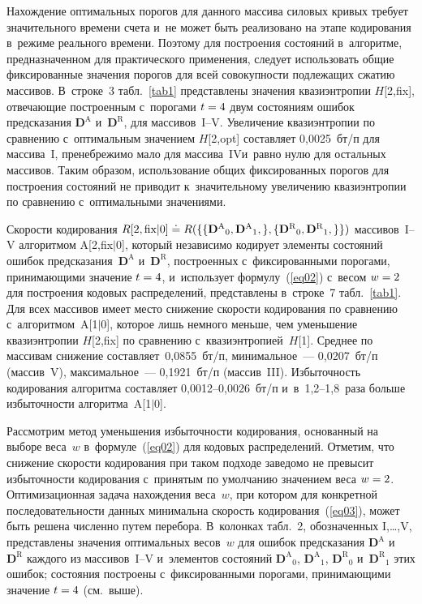 \begin{multicols}{2}
Нахождение оптимальных порогов для данного массива силовых кривых требует значительного 
времени счета и~не может быть реализовано на этапе кодирования в~режиме реального времени. 
Поэтому для построения состояний в~алгоритме, предназначенном для практического применения, 
следует использовать общие фиксированные значения порогов для всей совокупности подлежащих 
сжатию массивов. В~строке~3 табл.~\ref{tab1} представлены значения квазиэнтропии $H$[2,fix], 
отвечающие построенным с~порогами $t\hm=4$ двум состояниям ошибок предсказания $\mathbf{D}^\text{A}$ 
и~$\mathbf{D}^\text{R}$, для массивов~I--V. Увеличение квазиэнтропии по сравнению 
с~оптимальным значением $H$[2,opt] составляет 0,0025~бт/п для массива~I, пренебрежимо мало 
для массива~IV\linebreak и~равно нулю для остальных массивов. Таким об\-разом, использование 
общих фиксированных поро\-гов для построения состояний не приводит к~значительному 
увеличению квазиэнтропии по сравнению с~оптимальными значениями.

Скорости кодирования
$R[2,\text{fix}|0] \hm\doteq  R(\{ 
\{{\mathbf{D}^\text{A} }_0,{\mathbf{D}^\text{A} }_1,\},
\{{\mathbf{D}^\text{R} }_0,{\mathbf{D}^\text{R} }_1,\}
\})$
массивов~I--V алгоритмом A[2,fix$\vert$0], который независимо кодирует элементы состояний ошибок 
предсказания~$\mathbf{D}^\text{A}$ и~$\mathbf{D}^\text{R}$, построенных с~фиксированными порогами, 
принимающими значение $t\hm=4$, и~использует формулу~(\ref{eq02}) с~весом $w\hm=2$ для 
построения кодовых распределений, представлены в~строке~7 табл.~\ref{tab1}.\linebreak  
Для всех массивов имеет место снижение скорости кодирования по сравнению с~алгоритмом~A[1$\vert$0], 
которое лишь немного меньше, чем уменьшение \mbox{квазиэнтропии} $H$[2,fix] по 
сравнению с~квазиэнтропией~$H$[1]. Среднее по массивам снижение составляет~0,0855~бт/п, минимальное~--- 
0,0207~бт/п (массив~V), максимальное~--- 0,1921~бт/п (массив~III). Избыточность 
кодирования алгоритма составляет 0,0012--0,0026~бт/п и~в~1,2--1,8~раза больше избыточности алгоритма~A[1$\vert$0].

Рассмотрим метод уменьшения избыточности кодирования, 
основанный на выборе веса~$w$ в~формуле~(\ref{eq02}) для кодовых распределений. 
Отметим, что снижение скорости кодирования при таком подходе заведомо не превысит 
избыточности кодирования с~принятым по умолчанию значением веса $w\hm=2$. Оптимизационная 
задача нахождения веса~$w$, при котором для конкретной последовательности 
данных минимальна скорость кодирования~(\ref{eq03}), может быть решена численно 
путем перебора. В~колонках табл.~2, обозначенных I,\dots,V, представлены значения 
оптимальных весов~$w$ для ошибок предсказания $\mathbf{D}^\text{A}$ 
и~$\mathbf{D}^\text{R}$ каждого из массивов~I--V и~элементов состояний 
${\mathbf{D}^\text{A}}_0$, ${\mathbf{D}^\text{A}}_1$,
${\mathbf{D}^\text{R}}_0$ и~${\mathbf{D}^\text{R}}_1$
этих ошибок; состояния построены с~фиксированными порогами,  принимающими значение $t\hm=4$ (см.\ выше).



\end{multicols}
